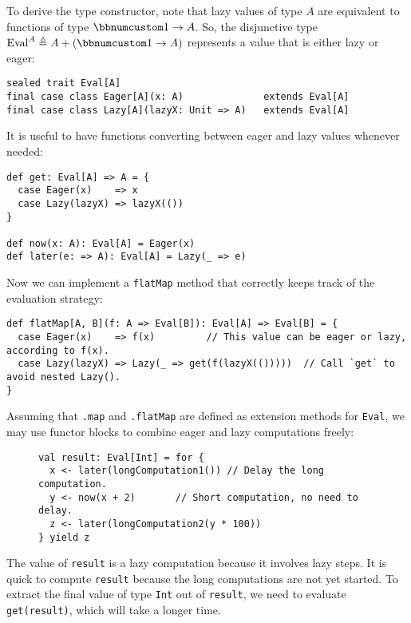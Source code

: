 To derive the type constructor, note that lazy values of type $A$
are equivalent to functions of type $\bbnum 1\rightarrow A$. So,
the disjunctive type $\text{Eval}^{A}\triangleq A+\left(\bbnum 1\rightarrow A\right)$
represents a value that is either lazy or eager:
\begin{lstlisting}
sealed trait Eval[A]
final case class Eager[A](x: A)              extends Eval[A]
final case class Lazy[A](lazyX: Unit => A)   extends Eval[A]
\end{lstlisting}
It is useful to have functions converting between eager and lazy values
whenever needed:
\begin{lstlisting}
def get: Eval[A] => A = {
  case Eager(x)    => x
  case Lazy(lazyX) => lazyX(())
}

def now(x: A): Eval[A] = Eager(x)
def later(e: => A): Eval[A] = Lazy(_ => e)
\end{lstlisting}
Now we can implement a \lstinline!flatMap! method that correctly
keeps track of the evaluation strategy:
\begin{lstlisting}
def flatMap[A, B](f: A => Eval[B]): Eval[A] => Eval[B] = {
  case Eager(x)    => f(x)         // This value can be eager or lazy, according to f(x).
  case Lazy(lazyX) => Lazy(_ => get(f(lazyX(()))))  // Call `get` to avoid nested Lazy().
}
\end{lstlisting}
Assuming that \lstinline!.map! and \lstinline!.flatMap! are defined
as extension methods for \lstinline!Eval!, we may use functor blocks
to combine eager and lazy computations freely:

\begin{wrapfigure}{l}{0.631\columnwidth}%
\vspace{-0.8\baselineskip}
\begin{lstlisting}
val result: Eval[Int] = for {
  x <- later(longComputation1()) // Delay the long computation.
  y <- now(x + 2)       // Short computation, no need to delay.
  z <- later(longComputation2(y * 100))
} yield z
\end{lstlisting}

\vspace{-1\baselineskip}
\end{wrapfigure}%

\noindent The value of \lstinline!result! is a lazy computation because
it involves lazy steps. It is quick to compute \lstinline!result!
because the long computations are not yet started. To extract the
final value of type \lstinline!Int! out of \lstinline!result!, we
need to evaluate \lstinline!get(result)!, which will take a longer
time.

